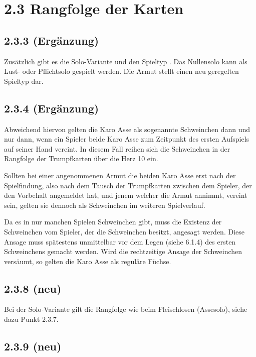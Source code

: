 \section*{2.3 Rangfolge der Karten}

\subsection*{2.3.3 (Ergänzung)}

Zusätzlich gibt es die Solo-Variante  und den
Spieltyp . Das Nullensolo kann als Lust- oder Pflichtsolo
gespielt werden. Die Armut stellt einen neu geregelten Spieltyp dar.

\subsection*{2.3.4 (Ergänzung)}

Abweichend hiervon gelten die Karo Asse als sogenannte Schweinchen dann
und nur dann, wenn ein Spieler beide Karo Asse zum Zeitpunkt des ersten
Aufspiels auf seiner Hand vereint. In diesem Fall reihen sich die
Schweinchen in der Rangfolge der Trumpfkarten über die Herz 10 ein.

Sollten bei einer angenommenen Armut die beiden Karo Asse erst nach der
Spielfindung, also nach dem Tausch der Trumpfkarten zwischen dem
Spieler, der den Vorbehalt angemeldet hat, und jenem welcher die Armut
annimmt, vereint sein, gelten sie dennoch als Schweinchen im weiteren
Spielverlauf.

Da es in nur manchen Spielen Schweinchen gibt, muss die Existenz der Schweinchen
vom Spieler, der die Schweinchen besitzt, angesagt werden. Diese Ansage muss
spätestens unmittelbar vor dem Legen (siehe 6.1.4) des ersten Schweinchens
gemacht werden. Wird die rechtzeitige Ansage der Schweinchen versäumt, so gelten
die Karo Asse als reguläre Füchse.

\clearpage

\subsection*{2.3.8 (neu)}

Bei der Solo-Variante  gilt die Rangfolge wie beim
Fleischlosen (Assesolo), siehe dazu Punkt 2.3.7.

\subsection*{2.3.9 (neu)}

